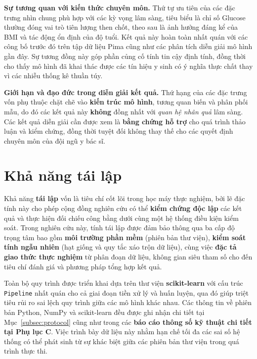 \documentclass[14pt,a4paper]{extreport}
\begin{document}
\textbf{Sự tương quan với kiến thức chuyên môn.} Thứ tự ưu tiên của các đặc trưng nhìn chung phù hợp với các kỳ vọng lâm sàng, tiêu biểu là chỉ số Glucose thường đóng vai trò tiên lượng then chốt, theo sau là ảnh hưởng đáng kể của BMI và tác động ổn định của độ tuổi. Kết quả này hoàn toàn nhất quán với các công bố trước đó trên tập dữ liệu Pima cũng như các phân tích diễn giải mô hình gần đây.\cite{chang2022pima,kirbas2025shap} Sự tương đồng này góp phần củng cố tính tin cậy định tính, đồng thời cho thấy mô hình đã khai thác được các tín hiệu y sinh có ý nghĩa thực chất thay vì các nhiễu thống kê thuần túy.

\textbf{Giới hạn và đạo đức trong diễn giải kết quả.} Thứ hạng của các đặc trưng vốn phụ thuộc chặt chẽ vào \textbf{kiến trúc mô hình}, tương quan biến và phân phối mẫu, do đó các kết quả này \textbf{không} đồng nhất với \emph{quan hệ nhân quả} lâm sàng. Các kết quả diễn giải cần được xem là \textbf{bằng chứng hỗ trợ} cho quá trình thảo luận và kiểm chứng, đồng thời tuyệt đối không thay thế cho các quyết định chuyên môn của đội ngũ y bác sĩ.

\section{Khả năng tái lập}
\label{subsec:repro}

Khả năng \textbf{tái lập} vốn là tiêu chí cốt lõi trong học máy thực nghiệm, bởi lẽ đặc tính này cho phép cộng đồng nghiên cứu có thể \textbf{kiểm chứng độc lập} các kết quả và thực hiện đối chiếu công bằng dưới cùng một hệ thống điều kiện kiểm soát. Trong nghiên cứu này, tính tái lập được đảm bảo thông qua ba cấp độ trọng tâm bao gồm \textbf{môi trường phần mềm} (phiên bản thư viện), \textbf{kiểm soát tính ngẫu nhiên} (hạt giống và quy tắc xáo trộn dữ liệu), cùng việc \textbf{đặc tả giao thức thực nghiệm} từ phân đoạn dữ liệu, không gian siêu tham số cho đến tiêu chí đánh giá và phương pháp tổng hợp kết quả.

Toàn bộ quy trình được triển khai dựa trên thư viện \textbf{scikit-learn} với cấu trúc \texttt{Pipeline} nhất quán cho cả giai đoạn tiền xử lý và huấn luyện, qua đó giúp triệt tiêu rủi ro sai lệch quy trình giữa các mô hình khác nhau.\cite{pedregosa2011} Các thông tin về phiên bản Python, NumPy và scikit-learn đều được ghi nhận chi tiết tại Mục~\ref{subsec:protocol} cũng như trong các \textbf{báo cáo thông số kỹ thuật chi tiết tại Phụ lục C}. Việc trình bày dữ liệu này nhằm hạn chế tối đa các sai số hệ thống có thể phát sinh từ sự khác biệt giữa các phiên bản thư viện trong quá trình thực thi.
\end{document}
